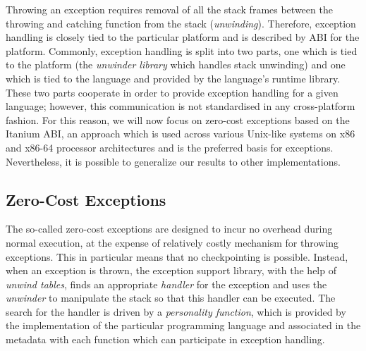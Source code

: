 Throwing an exception requires removal of all the stack frames
between the throwing and catching function from the stack (\emph{unwinding}).
Therefore, exception handling is closely tied to the particular platform and is
described by ABI for the platform.
Commonly, exception handling is split into two parts, one which is tied to the
platform (the \emph{unwinder library} which handles stack unwinding) and one
which is tied to the language and provided by the language's runtime
library.
These two parts cooperate in order to provide exception handling for a
given language; however, this communication is not standardised in any
cross-platform fashion.
For this reason, we will now focus on zero-cost exceptions based on the Itanium
ABI, an approach which is used across various Unix-like systems on x86
and x86-64 processor architectures and is the preferred basis for
\llvm{} exceptions.
Nevertheless, it is possible to generalize our results to other
implementations.

\subsection{Zero-Cost Exceptions}\label{sec:lang:zerocost}

The so-called zero-cost exceptions are designed to incur no overhead
during normal execution, at the expense of relatively costly mechanism
for throwing exceptions. This in particular means that no checkpointing
is possible. Instead, when an exception is thrown, the exception support
library, with the help of \emph{unwind tables}, finds an appropriate
\emph{handler} for the exception and uses the \emph{unwinder} to
manipulate the stack so that this handler can be executed. The search
for the handler is driven by a \emph{personality function}, which is
provided by the implementation of the particular programming language
and associated in the metadata with each function which can participate in exception handling.

